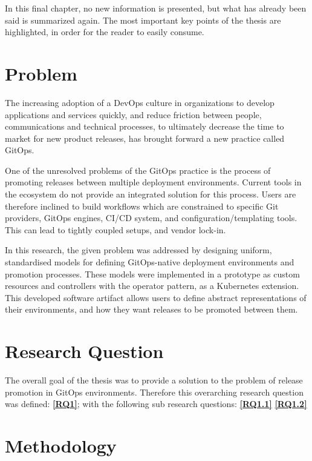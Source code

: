 In this final chapter,
no new information is presented,
but what has already been said is summarized again.
The most important key points of the thesis are highlighted,
in order for the reader to easily consume.

\section*{Problem}

The increasing adoption of a DevOps culture in organizations to develop applications and services quickly,
and reduce friction between people, communications and technical processes,
to ultimately decrease the time to market for new product releases,
has brought forward a new practice called GitOps.

One of the unresolved problems of the GitOps practice is
the process of promoting releases between multiple deployment environments.
Current tools in the ecosystem do not provide an integrated solution for this process.
Users are therefore inclined to build workflows which are constrained to specific
Git providers, GitOps engines,
CI/CD system, and configuration/templating tools. This can lead to tightly coupled setups,
and vendor lock-in.

In this research,
the given problem was addressed by designing uniform, standardised models for
defining GitOps-native deployment environments and promotion processes.
These models were implemented in a prototype as custom resources and controllers with the
operator pattern, as a Kubernetes extension.
This developed software artifact allows users to define abstract representations
of their environments, and how they want releases to be promoted between them.

\section*{Research Question}

The overall goal of the thesis was to provide a solution to the problem of
release promotion in GitOps environments.
Therefore this overarching research question was defined:
\textbf{\ref{RQ1}};
with the following sub research questions:
\textbf{\ref{RQ1.1}}
\textbf{\ref{RQ1.2}}

\section*{Methodology}

